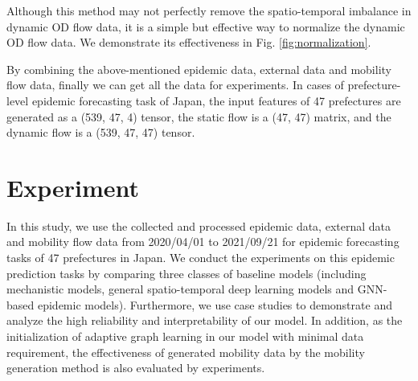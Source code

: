 \documentclass[lettersize,journal]{IEEEtran}
\begin{document}
Although this method may not perfectly remove the spatio-temporal imbalance in dynamic OD flow data, it is a simple but effective way to normalize the dynamic OD flow data. We demonstrate its effectiveness in Fig. \ref{fig:normalization}.

By combining the above-mentioned epidemic data, external data and mobility flow data, finally we can get all the data for experiments. In cases of prefecture-level epidemic forecasting task of Japan, the input features of 47 prefectures are generated as a (539, 47, 4) tensor, the static flow is a (47, 47) matrix, and the dynamic flow is a (539, 47, 47) tensor. 

\section{Experiment}\label{sec:experiment}
In this study, we use the collected and processed epidemic data, external data and mobility flow data from 2020/04/01 to 2021/09/21 for epidemic forecasting tasks of 47 prefectures in Japan. We conduct the experiments on this epidemic prediction tasks by comparing three classes of baseline models (including mechanistic models, general spatio-temporal deep learning models and GNN-based epidemic models). Furthermore, we use case studies to demonstrate and analyze the high reliability and interpretability of our model. In addition, as the initialization of adaptive graph learning in our model with minimal data requirement, the effectiveness of generated mobility data by the mobility generation method is also evaluated by experiments.
\end{document}
